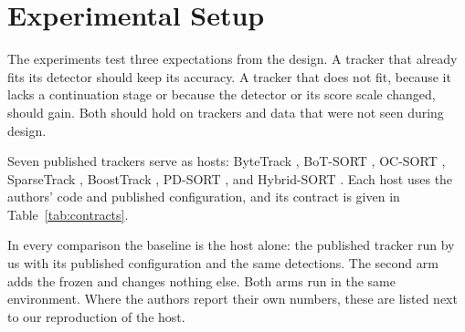 \section{Experimental Setup}\label{sec:setup}

The experiments test three expectations from the design. A tracker that
already fits its detector should keep its accuracy. A tracker that does not
fit, because it lacks a continuation stage or because the detector or its
score scale changed, should gain. Both should hold on trackers and data that
were not seen during design.

\label{sec:hosts}Seven published trackers serve as hosts: ByteTrack \cite{zhang2022bytetrack},
BoT-SORT \cite{aharon2022botsort}, OC-SORT \cite{cao2023ocsort}, SparseTrack
\cite{liu2025sparsetrack}, BoostTrack \cite{stanojevic2024boosttrack},
PD-SORT \cite{wang2025pdsort}, and Hybrid-SORT \cite{yang2024hybridsort}.
Each host uses the authors' code and published configuration,
and its contract is given in Table~\ref{tab:contracts}.

In every comparison the baseline is the host alone: the published tracker run
by us with its published configuration and the same detections. The second
arm adds the frozen \scl{} and changes nothing else. Both arms run in the same
environment. Where the authors report their own numbers, these are listed
next to our reproduction of the host.
